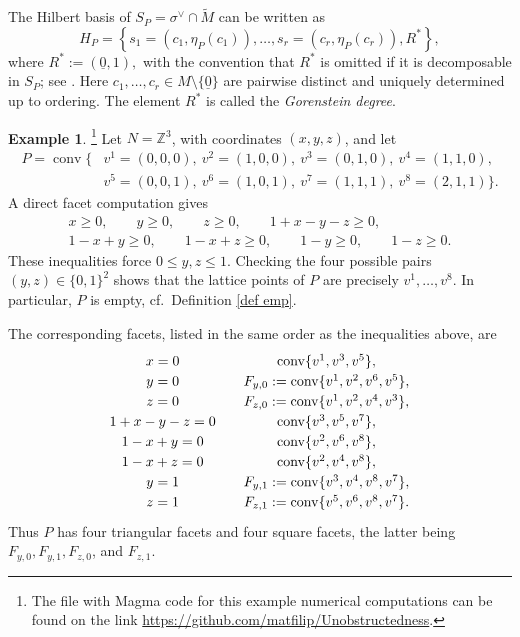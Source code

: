 \documentclass[11pt]{amsart}
\numberwithin{equation}{section}
\theoremstyle{plain}
\theoremstyle{definition}
\newtheorem{example}[theorem]{Example}
\newcommand{\0}{$0$-mutable}
\newcommand{\ZZ}{\ensuremath{\mathbb{Z}}}
\renewcommand{\1}{$1$-rigid}
\renewcommand{\0}{$0$-mutable}
\begin{document}
The Hilbert basis of \(S_P=\sigma^\vee\cap\widetilde M\) can be written as
\begin{equation}\label{eg hilbbas}
H_P
=
\left\{
s_1=(c_1,\eta_P(c_1)),\ldots,
s_r=(c_r,\eta_P(c_r)),R^*
\right\},
\end{equation}
where
$
R^*:=(\underline 0,1),
$
with the convention that \(R^*\) is omitted if it is decomposable in
\(S_P\); see \cite[Section~4.3]{Alt97}. Here
\(c_1,\ldots,c_r\in M\setminus\{\underline 0\}\) are pairwise distinct
and uniquely determined up to ordering. The element \(R^*\) is called
the \emph{Gorenstein degree}.


\begin{example}\label{ex eight vertex polytope hilbert basis}{\footnote{The  file with Magma code for this example numerical computations can be found on the link \url{https://github.com/matfilip/Unobstructedness}.}} 
Let \(N=\ZZ^3\), with coordinates \((x,y,z)\), and let
\[
\begin{aligned}
P=\operatorname{conv}\{&v^1=(0,0,0),\ v^2=(1,0,0),\
 v^3=(0,1,0),\ v^4=(1,1,0),\\
&v^5=(0,0,1),\ v^6=(1,0,1),\
 v^7=(1,1,1),\ v^8=(2,1,1)\}.
\end{aligned}
\]
A direct facet computation gives
\[
\begin{gathered}
x\geq0,\qquad y\geq0,\qquad z\geq0,\qquad
1+x-y-z\geq0,\\
1-x+y\geq0,\qquad 1-x+z\geq0,\qquad
1-y\geq0,\qquad 1-z\geq0.
\end{gathered}
\]
These inequalities force \(0\leq y,z\leq1\). Checking the four possible
pairs \((y,z)\in\{0,1\}^2\) shows that the lattice points of \(P\) are
precisely \(v^1,\ldots,v^8\). In particular, \(P\) is empty, cf.\ Definition \ref{def emp}.

{The corresponding facets, listed in the same order as the inequalities
above, are
\[
\renewcommand{\arraystretch}{1.2}
\begin{array}{c@{\qquad}c}
x=0
&
\operatorname{conv}\{v^1,v^3,v^5\},
\\
y=0
&
F_{y,0}:=\operatorname{conv}\{v^1,v^2,v^6,v^5\},
\\
z=0
&
F_{z,0}:=\operatorname{conv}\{v^1,v^2,v^4,v^3\},
\\
1+x-y-z=0
&
\operatorname{conv}\{v^3,v^5,v^7\},
\\
1-x+y=0
&
\operatorname{conv}\{v^2,v^6,v^8\},
\\
1-x+z=0
&
\operatorname{conv}\{v^2,v^4,v^8\},
\\
y=1
&
F_{y,1}:=\operatorname{conv}\{v^3,v^4,v^8,v^7\},
\\
z=1
&
F_{z,1}:=\operatorname{conv}\{v^5,v^6,v^8,v^7\}.
\end{array}
\]
Thus \(P\) has four triangular facets and four square facets, the latter
being \(F_{y,0},F_{y,1},F_{z,0}\), and \(F_{z,1}\).

}
\end{example}
\end{document}
